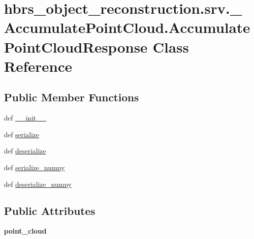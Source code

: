 \hypertarget{classhbrs__object__reconstruction_1_1srv_1_1___accumulate_point_cloud_1_1_accumulate_point_cloud_response}{\section{hbrs\-\_\-object\-\_\-reconstruction.\-srv.\-\_\-\-Accumulate\-Point\-Cloud.\-Accumulate\-Point\-Cloud\-Response \-Class \-Reference}
\label{classhbrs__object__reconstruction_1_1srv_1_1___accumulate_point_cloud_1_1_accumulate_point_cloud_response}
}
\subsection*{\-Public \-Member \-Functions}
\begin{DoxyCompactItemize}
\item 
def \hyperlink{classhbrs__object__reconstruction_1_1srv_1_1___accumulate_point_cloud_1_1_accumulate_point_cloud_response_a5e2446a1e64f7f1934042b9344d60222}{\-\_\-\-\_\-init\-\_\-\-\_\-}
\item 
def \hyperlink{classhbrs__object__reconstruction_1_1srv_1_1___accumulate_point_cloud_1_1_accumulate_point_cloud_response_ab2c4814600081419ea3a63cf11d2e1de}{serialize}
\item 
def \hyperlink{classhbrs__object__reconstruction_1_1srv_1_1___accumulate_point_cloud_1_1_accumulate_point_cloud_response_a8af49c098f5d17d4a161d4a5af565618}{deserialize}
\item 
def \hyperlink{classhbrs__object__reconstruction_1_1srv_1_1___accumulate_point_cloud_1_1_accumulate_point_cloud_response_a6d9de21c95f500c5db44ce3007269d1b}{serialize\-\_\-numpy}
\item 
def \hyperlink{classhbrs__object__reconstruction_1_1srv_1_1___accumulate_point_cloud_1_1_accumulate_point_cloud_response_a6748cba20275f2cd6e8c98376d1d9d40}{deserialize\-\_\-numpy}
\end{DoxyCompactItemize}
\subsection*{\-Public \-Attributes}
\begin{DoxyCompactItemize}
\item 
\hypertarget{classhbrs__object__reconstruction_1_1srv_1_1___accumulate_point_cloud_1_1_accumulate_point_cloud_response_afc6e911fc3718485075010b13897a170}{{\bfseries point\-\_\-cloud}}\label{classhbrs__object__reconstruction_1_1srv_1_1___accumulate_point_cloud_1_1_accumulate_point_cloud_response_afc6e911fc3718485075010b13897a170}

\end{DoxyCompactItemize}



